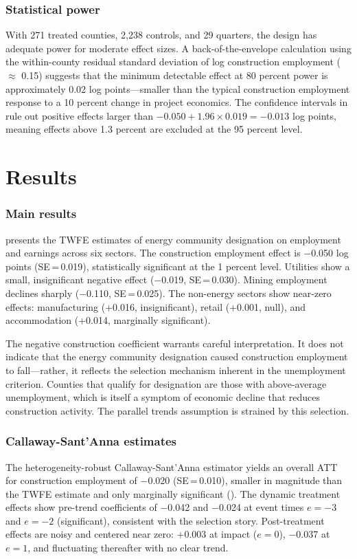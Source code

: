 \documentclass[12pt]{article}
\begin{document}
\subsubsection*{Statistical power}
With 271 treated counties, 2,238 controls, and 29 quarters, the design has adequate power for moderate effect sizes. A back-of-the-envelope calculation using the within-county residual standard deviation of log construction employment ($\approx$ 0.15) suggests that the minimum detectable effect at 80 percent power is approximately 0.02 log points---smaller than the typical construction employment response to a 10 percent change in project economics. The confidence intervals in  rule out positive effects larger than $-0.050 + 1.96 \times 0.019 = -0.013$ log points, meaning effects above 1.3 percent are excluded at the 95 percent level.


\section{Results}
\label{sec:results}

\subsubsection*{Main results}
 presents the TWFE estimates of energy community designation on employment and earnings across six sectors. The construction employment effect is $-$0.050 log points (SE\,=\,0.019), statistically significant at the 1 percent level. Utilities show a small, insignificant negative effect ($-$0.019, SE\,=\,0.030). Mining employment declines sharply ($-$0.110, SE\,=\,0.025). The non-energy sectors show near-zero effects: manufacturing (+0.016, insignificant), retail (+0.001, null), and accommodation (+0.014, marginally significant).

The negative construction coefficient warrants careful interpretation. It does not indicate that the energy community designation caused construction employment to fall---rather, it reflects the selection mechanism inherent in the unemployment criterion. Counties that qualify for designation are those with above-average unemployment, which is itself a symptom of economic decline that reduces construction activity. The parallel trends assumption is strained by this selection.



\subsubsection*{Callaway-Sant'Anna estimates}
The heterogeneity-robust Callaway-Sant'Anna estimator yields an overall ATT for construction employment of $-$0.020 (SE\,=\,0.010), smaller in magnitude than the TWFE estimate and only marginally significant (). The dynamic treatment effects show pre-trend coefficients of $-$0.042 and $-$0.024 at event times $e = -3$ and $e = -2$ (significant), consistent with the selection story. Post-treatment effects are noisy and centered near zero: $+$0.003 at impact ($e = 0$), $-$0.037 at $e = 1$, and fluctuating thereafter with no clear trend.
\end{document}
